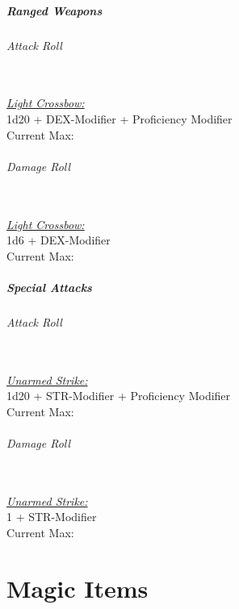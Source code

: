 \documentclass[letterpaper,openany,oneside,twocolumn]{book}
\newcommand{\PATH}{../../../}
\begin{document}
\subsubsection*{Ranged Weapons}
\paragraph*{Attack Roll}\hfill\\
\underline{\textit{Light Crossbow:}}\\
1d20 + DEX-Modifier + Proficiency Modifier\\
\indent Current Max: 
\paragraph*{Damage Roll}\hfill\\
\underline{\textit{Light Crossbow:}}\\
1d6 + DEX-Modifier\\
\indent Current Max: 
\subsubsection*{Special Attacks}
\paragraph*{Attack Roll}\hfill\\
\underline{\textit{Unarmed Strike:}}\\
1d20 + STR-Modifier + Proficiency Modifier\\
\indent Current Max: 
\paragraph*{Damage Roll}\hfill\\
\underline{\textit{Unarmed Strike:}}\\
1 + STR-Modifier\\
\indent Current Max: 

\part*{Magic Items}



\newpage
\end{document}
